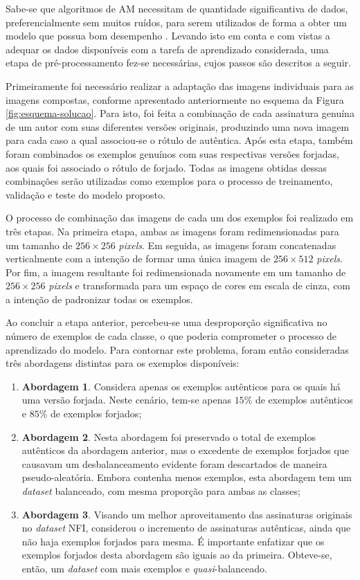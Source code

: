 Sabe-se que algoritmos de AM necessitam de quantidade significantiva de dados, preferencialmente sem muitos ruídos, para serem utilizados de forma a obter um modelo que possua bom desempenho \cite{marsland}. Levando isto em conta e com vistas a adequar os dados disponíveis com a tarefa de aprendizado considerada, uma etapa de pré-processamento fez-se necessárias, cujos passos são descritos a seguir.

Primeiramente foi necessário realizar a adaptação das imagens individuais para as imagens compostas, conforme apresentado anteriormente no esquema da Figura \ref{fig:esquema-solucao}. Para isto, foi feita a combinação de cada assinatura genuína de um autor com suas diferentes versões originais, produzindo uma nova imagem para cada caso a qual associou-se o rótulo de autêntica. Após esta etapa, também foram combinados os exemplos genuínos com suas respectivas versões forjadas, aos quais foi associado o rótulo de forjado. Todas as imagens obtidas dessas combinações serão utilizadas como exemplos para o processo de treinamento, validação e teste do modelo proposto.

O processo de combinação das imagens de cada um dos exemplos foi realizado em três etapas. Na primeira etapa, ambas as imagens foram redimensionadas para um tamanho de $256 \times 256$ \emph{pixels}. Em seguida, as imagens foram concatenadas verticalmente com a intenção de formar uma única imagem de $256 \times 512$ \emph{pixels}. Por fim, a imagem resultante foi redimensionada novamente em um tamanho de $256 \times 256$ \emph{pixels} e transformada para um espaço de cores em escala de cinza, com a intenção de padronizar todas os exemplos.


Ao concluir a etapa anterior, percebeu-se uma desproporção significativa no número de exemplos de cada classe, o que poderia comprometer o processo de aprendizado do modelo. Para contornar este problema, foram então consideradas três abordagens distintas para os exemplos disponíveis:

\begin{enumerate}
	\item \textbf{Abordagem 1}. Considera apenas os exemplos autênticos para os quais há uma versão forjada. Neste cenário, tem-se apenas $15\%$ de exemplos autênticos e $85\%$ de exemplos forjados;
	\item \textbf{Abordagem 2}. Nesta abordagem foi preservado o total de exemplos autênticos da abordagem anterior, mas o excedente de exemplos forjados que causavam um desbalanceamento evidente foram descartados de maneira pseudo-aleatória. Embora contenha menos exemplos, esta abordagem tem um \emph{dataset} balanceado, com mesma proporção para ambas as classes;
	\item \textbf{Abordagem 3}. Visando um melhor aproveitamento das assinaturas originais no \emph{dataset} NFI, considerou o incremento de assinaturas autênticas, ainda que não haja exemplos forjados para mesma. É importante enfatizar que os exemplos forjados desta abordagem são iguais ao da primeira. Obteve-se, então, um \emph{dataset} com mais exemplos e \emph{quasi}-balanceado.
\end{enumerate}

